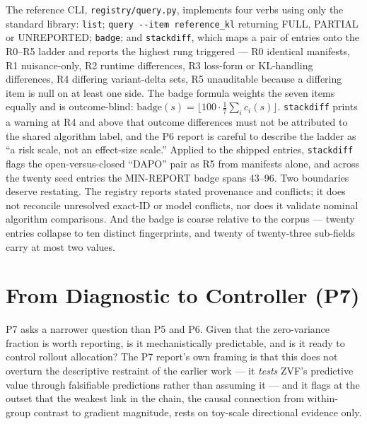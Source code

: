 \documentclass[12pt,a4paper]{report}
\begin{document}
The reference CLI, \texttt{registry/query.py}, implements four verbs
using only the standard library: \texttt{list};
\texttt{query\ -\/-item\ reference\_kl} returning FULL, PARTIAL or
UNREPORTED; \texttt{badge}; and \texttt{stackdiff}, which maps a pair of
entries onto the R0--R5 ladder and reports the highest rung triggered
--- R0 identical manifests, R1 nuisance-only, R2 runtime differences, R3
loss-form or KL-handling differences, R4 differing variant-delta sets,
R5 unauditable because a differing item is null on at least one side.
The badge formula weights the seven items equally and is outcome-blind:
\(\mathrm{badge}(s) = \lfloor 100 \cdot \tfrac{1}{7} \sum_i c_i(s) \rfloor\).
\texttt{stackdiff} prints a warning at R4 and above that outcome
differences must not be attributed to the shared algorithm label, and
the P6 report is careful to describe the ladder as ``a risk scale, not
an effect-size scale.'' Applied to the shipped entries,
\texttt{stackdiff} flags the open-versus-closed ``DAPO'' pair as R5 from
manifests alone, and across the twenty seed entries the MIN-REPORT badge
spans 43--96. Two boundaries deserve restating. The registry reports
stated provenance and conflicts; it does not reconcile unresolved
exact-ID or model conflicts, nor does it validate nominal algorithm
comparisons. And the badge is coarse relative to the corpus --- twenty
entries collapse to ten distinct fingerprints, and twenty of
twenty-three sub-fields carry at most two values.

\section{From Diagnostic to Controller
(P7)}\label{from-diagnostic-to-controller-p7}

P7 asks a narrower question than P5 and P6. Given that the zero-variance
fraction is worth reporting, is it mechanistically predictable, and is
it ready to control rollout allocation? The P7 report's own framing is
that this does not overturn the descriptive restraint of the earlier
work --- it \emph{tests} ZVF's predictive value through falsifiable
predictions rather than assuming it --- and it flags at the outset that
the weakest link in the chain, the causal connection from within-group
contrast to gradient magnitude, rests on toy-scale directional evidence
only.
\end{document}
